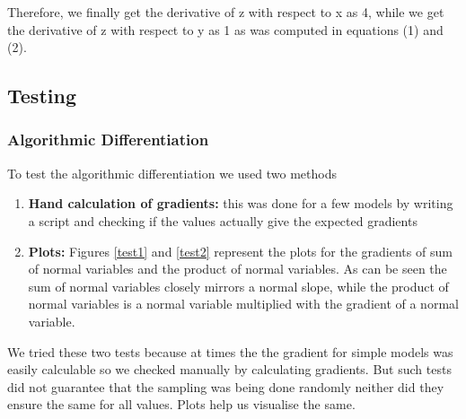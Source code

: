 \documentclass[a4paper,11pt]{article}
\theoremstyle{mytheor}
\begin{document}
    Therefore, we finally get the derivative of z with respect to x as 4, while we get the derivative of z with respect to y as 1 as was computed in equations (1) and (2). 
    
    \subsection{Testing}
    
    \subsubsection{Algorithmic Differentiation}
        To test the algorithmic differentiation we used two methods
        \begin{enumerate}
            \item\textbf{Hand calculation of gradients:} this was done for a few models by writing a script and checking if the values actually give the expected gradients
            \item\textbf{Plots:} Figures \ref{test1} and \ref{test2} represent the plots for the gradients of sum of normal variables and the product of normal variables. As can be seen the sum of normal variables closely mirrors a normal slope, while the product of normal variables is a normal variable multiplied with the gradient of a normal variable.
        \end{enumerate}
        We tried these two tests because at times the the gradient for simple models was easily calculable so we checked manually by calculating gradients. But such tests did not guarantee that the sampling was being done randomly neither did they ensure the same for all values. Plots help us visualise the same.   
    
\end{document}
